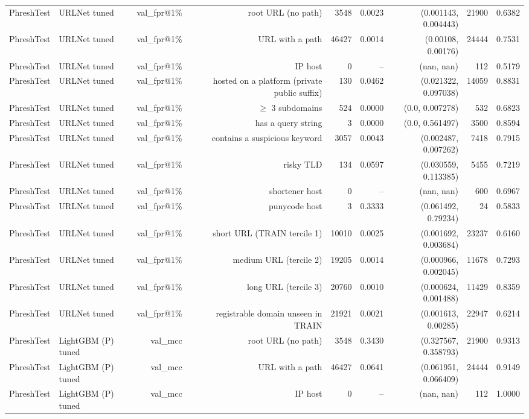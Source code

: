 \begin{table}[t]
\begin{tabular}{llrrrrrrr}
PhreshTest & URLNet tuned & val\_fpr@1\% & root URL (no path) & 3548 & 0.0023 & (0.001143, 0.004443) & 21900 & 0.6382 \\
PhreshTest & URLNet tuned & val\_fpr@1\% & URL with a path & 46427 & 0.0014 & (0.00108, 0.00176) & 24444 & 0.7531 \\
PhreshTest & URLNet tuned & val\_fpr@1\% & IP host & 0 & -- & (nan, nan) & 112 & 0.5179 \\
PhreshTest & URLNet tuned & val\_fpr@1\% & hosted on a platform (private public suffix) & 130 & 0.0462 & (0.021322, 0.097038) & 14059 & 0.8831 \\
PhreshTest & URLNet tuned & val\_fpr@1\% & $\geq$ 3 subdomains & 524 & 0.0000 & (0.0, 0.007278) & 532 & 0.6823 \\
PhreshTest & URLNet tuned & val\_fpr@1\% & has a query string & 3 & 0.0000 & (0.0, 0.561497) & 3500 & 0.8594 \\
PhreshTest & URLNet tuned & val\_fpr@1\% & contains a suspicious keyword & 3057 & 0.0043 & (0.002487, 0.007262) & 7418 & 0.7915 \\
PhreshTest & URLNet tuned & val\_fpr@1\% & risky TLD & 134 & 0.0597 & (0.030559, 0.113385) & 5455 & 0.7219 \\
PhreshTest & URLNet tuned & val\_fpr@1\% & shortener host & 0 & -- & (nan, nan) & 600 & 0.6967 \\
PhreshTest & URLNet tuned & val\_fpr@1\% & punycode host & 3 & 0.3333 & (0.061492, 0.79234) & 24 & 0.5833 \\
PhreshTest & URLNet tuned & val\_fpr@1\% & short URL (TRAIN tercile 1) & 10010 & 0.0025 & (0.001692, 0.003684) & 23237 & 0.6160 \\
PhreshTest & URLNet tuned & val\_fpr@1\% & medium URL (tercile 2) & 19205 & 0.0014 & (0.000966, 0.002045) & 11678 & 0.7293 \\
PhreshTest & URLNet tuned & val\_fpr@1\% & long URL (tercile 3) & 20760 & 0.0010 & (0.000624, 0.001488) & 11429 & 0.8359 \\
PhreshTest & URLNet tuned & val\_fpr@1\% & registrable domain unseen in TRAIN & 21921 & 0.0021 & (0.001613, 0.00285) & 22947 & 0.6214 \\
PhreshTest & LightGBM (P) tuned & val\_mcc & root URL (no path) & 3548 & 0.3430 & (0.327567, 0.358793) & 21900 & 0.9313 \\
PhreshTest & LightGBM (P) tuned & val\_mcc & URL with a path & 46427 & 0.0641 & (0.061951, 0.066409) & 24444 & 0.9149 \\
PhreshTest & LightGBM (P) tuned & val\_mcc & IP host & 0 & -- & (nan, nan) & 112 & 1.0000 \\

\end{tabular}
\end{table}
